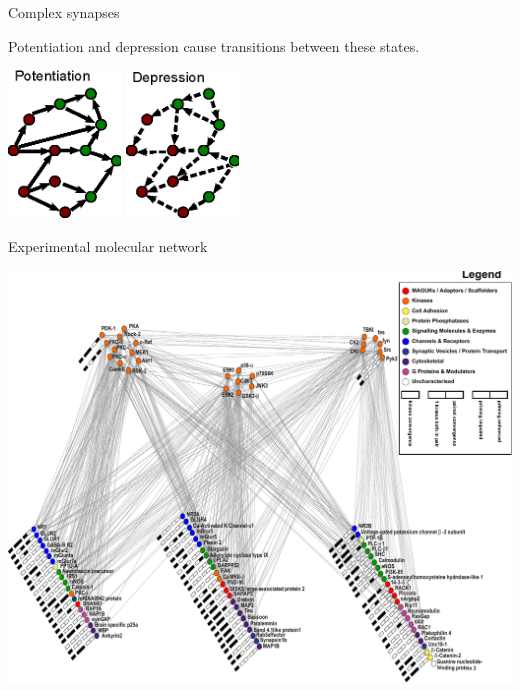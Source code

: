 \documentclass[final,hyperref={pdfpagelabels=false,bookmarks=false}]{beamer}
\newcommand{\citerr}[1]{\hfill {\footnotesize{\color{darkgrey}\cite{#1}}}}
\newcommand{\net}{molecular network}
\begin{document}
\begin{frame}{}
\begin{columns}[t]
\begin{column}{0.32\linewidth}
\begin{block}{Complex synapses}
\vp
\parbox{22cm}{
 Potentiation and depression cause transitions between these states.
}
\hspace{3cm}
\parbox{11cm}{
 \includegraphics[width=3cm]{pot.eps}
 \hspace{2cm}
 \includegraphics[width=3cm]{dep.eps}
}

 \vp Experimental \net
 \citerr{Coba2009phosphorylation}
 \begin{center}
 \includegraphics[width=15cm]{2000102CobaFig4.pdf}
 \end{center}
%
\end{block}



\end{column}
\end{columns}
\end{frame}
\end{document}
